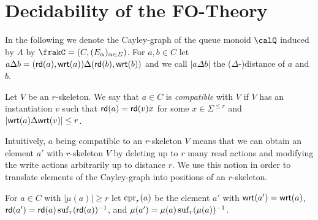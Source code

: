 \section{Decidability of the FO-Theory}
In the following we denote the Cayley-graph of the queue monoid $\Qx$ induced by $A$ by $\frakC=(C,(E_\alpha)_{\alpha\in\Sigma})$. 
For $a,b\in C$ let $a\Delta b = (\mathsf{rd}(a), \mathsf{wrt}(a))\Delta (\mathsf{rd}(b), \mathsf{wrt}(b))$ and we call $|a\Delta b|$ the ($\Delta$-)distance of $a$ and $b$. 
\begin{definition}
	Let $V$ be an $r$-skeleton. We say that $a\in C$ is \emph{compatible} with $V$ 
	if $V$ has an instantiation $v$ such that $\mathsf{rd}(a)= \mathsf{rd}(v)x$ for some $x\in \Sigma^{\leq r}$ and 
	$|\mathsf{wrt}(a) \Delta \mathsf{wrt}(v)| \leq r$.
\end{definition}
Intuitively, $a$ being compatible to an $r$-skeleton $V$ means that we can obtain an element
$a'$ with $r$-skeleton $V$ by deleting up to $r$ many  read actions and modifying the write
actions arbitrarily up to distance $r$. We use this notion in order to translate elements of the Cayley-graph
into positions of an $r$-skeleton.

\begin{definition}
	For $a\in C$ with $|\mu(a)| \geq r$ let $\operatorname{cpr}_r(a)$ be the element $a'$  with $\mathsf{wrt}(a') = \mathsf{wrt}(a)$, $\mathsf{rd}(a')=\mathsf{rd}(a)\operatorname{suf}_{r}({\mathsf{rd}(a)})^{-1}$, and $\mu(a') = \mu(a) \operatorname{suf}_{r}({\mu({a})})^{-1}$.
\end{definition}

